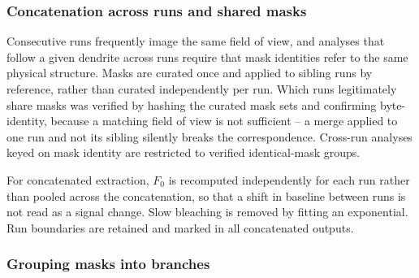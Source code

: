 
		\subsubsection{Concatenation across runs and shared masks}

			Consecutive runs frequently image the same field of view, and
			analyses that follow a given dendrite across runs require that mask
			identities refer to the same physical structure.
			Masks are curated once and applied to sibling runs by reference,
			rather than curated independently per run.
			Which runs legitimately share masks was verified by hashing the
			curated mask sets and confirming byte-identity, because a matching
			field of view is not sufficient -- a merge applied to one run and not
			its sibling silently breaks the correspondence.
			Cross-run analyses keyed on mask identity are restricted to verified
			identical-mask groups.

			For concatenated extraction, $F_0$ is recomputed independently for
			each run rather than pooled across the concatenation, so that a shift
			in baseline between runs is not read as a signal change.
			Slow bleaching is removed by fitting an exponential.
			Run boundaries are retained and marked in all concatenated outputs.


		\subsubsection{Grouping masks into branches}

